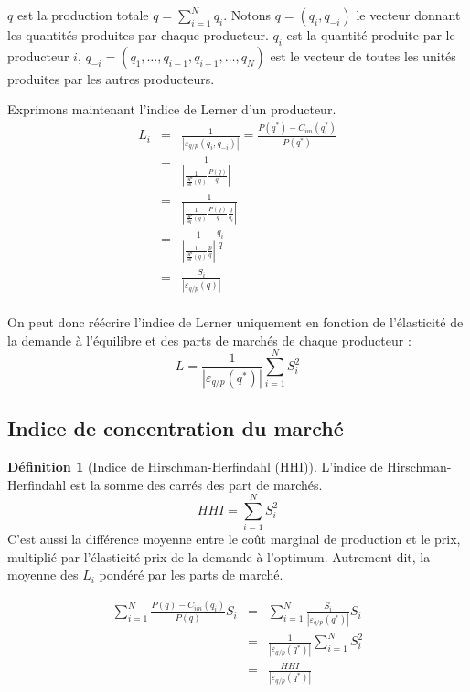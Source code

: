 \documentclass[
]{book}
\theoremstyle{definition}
\newtheorem{definition}{Définition}[chapter]
\theoremstyle{definition}
\theoremstyle{definition}
\theoremstyle{definition}
\theoremstyle{remark}
\begin{document}
\(q\) est la production totale \(q=\sum_{i=1}^N q_i\).
Notons \(q=(q_i, q_{-i})\) le vecteur donnant les quantités produites par chaque producteur.
\(q_i\) est la quantité produite par le producteur \(i\), \(q_{-i}=(q_1,\dots,q_{i-1}, q_{i+1}, \dots,q_N)\) est le vecteur de toutes les unités produites par les autres producteurs.

Exprimons maintenant l'indice de Lerner d'un producteur.
\[
\begin{array}{rcl}
L_i &=&\frac{1}{\left|\varepsilon_{q/p}(q_i, q_{-i})\right|}=\frac{P(q^*)-C_{im}(q_i^*)}{P(q^*)}\\
&=&\frac{1}{\left|\frac{1}{\frac{\partial P}{\partial q}(q)}\frac{P(q)}{q_i}\right|}\\
&=&\frac{1}{\left|\frac{1}{\frac{\partial P}{\partial q}(q)}\frac{P(q)}{q}\frac{q}{q_i}\right|}\\
&=&\frac{1}{\left|\frac{1}{\frac{\partial P}{\partial q}(q)}\frac{p}{q}\right|}\frac{q_i}{q}\\
&=&\frac{S_i}{\left|\varepsilon_{q/p}(q)\right|}\\
\end{array}
\]

On peut donc réécrire l'indice de Lerner uniquement en fonction de l'élasticité de la demande à l'équilibre et des parts de marchés de chaque producteur :
\[
L=\frac{1}{\left|\varepsilon_{q/p}(q^*)\right|}\sum_{i=1}^NS_i^2
\]

\hypertarget{indice-de-concentration-du-marchuxe9}{%
\subsection{Indice de concentration du marché}\label{indice-de-concentration-du-marchuxe9}}

\begin{definition}[Indice de Hirschman-Herfindahl (HHI)]
\protect\hypertarget{def:HHI}{}\label{def:HHI}L'indice de Hirschman-Herfindahl est la somme des carrés des part de marchés.
\[HHI = \sum_{i=1}^NS_i^2\]
C'est aussi la différence moyenne entre le coût marginal de production et le prix, multiplié par l'élasticité prix de la demande à l'optimum.
Autrement dit, la moyenne des \(L_i\) pondéré par les parts de marché.
\end{definition}

\[
 \begin{array}{rcl}
 \sum_{i=1}^{N}\frac{P(q) -C_{im}(q_i)}{P(q)}S_i &=&\sum_{i=1}^{N} \frac{S_i}{\left|\varepsilon_{q/p}(q^*)\right|}S_i \\
 &=&\frac{1}{\left|\varepsilon_{q/p}(q^*)\right|}\sum_{i=1}^NS_i^2\\
 &=&\frac{HHI}{\left|\varepsilon_{q/p}(q^*)\right|}
 \end{array}
 \]
\end{document}

